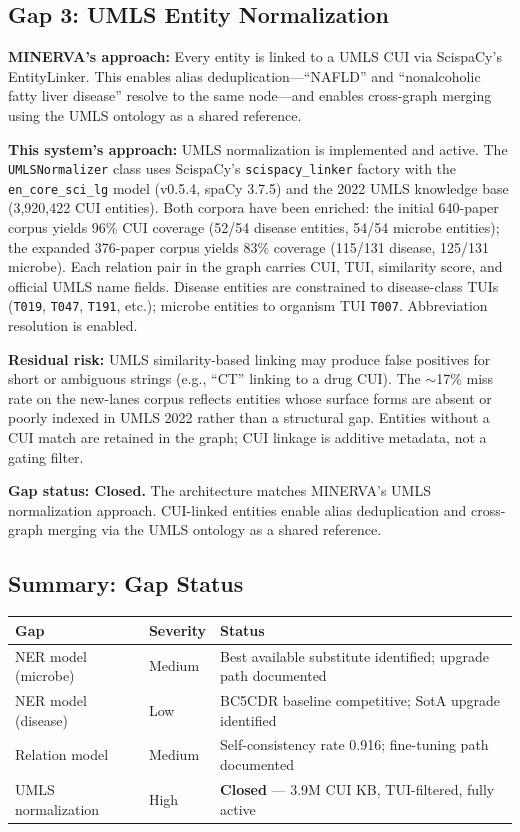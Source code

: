 \documentclass[12pt, letterpaper]{article}
\begin{document}
\subsection{Gap 3: UMLS Entity Normalization}

\textbf{MINERVA's approach:} Every entity is linked to a UMLS CUI via ScispaCy's EntityLinker. This enables alias deduplication—``NAFLD'' and ``nonalcoholic fatty liver disease'' resolve to the same node—and enables cross-graph merging using the UMLS ontology as a shared reference.

\textbf{This system's approach:} UMLS normalization is implemented and active. The \texttt{UMLSNormalizer} class uses ScispaCy's \texttt{scispacy\_linker} factory with the \texttt{en\_core\_sci\_lg} model (v0.5.4, spaCy 3.7.5) and the 2022 UMLS knowledge base (3,920,422 CUI entities). Both corpora have been enriched: the initial 640-paper corpus yields 96\% CUI coverage (52/54 disease entities, 54/54 microbe entities); the expanded 376-paper corpus yields 83\% coverage (115/131 disease, 125/131 microbe). Each relation pair in the graph carries CUI, TUI, similarity score, and official UMLS name fields. Disease entities are constrained to disease-class TUIs (\texttt{T019}, \texttt{T047}, \texttt{T191}, etc.); microbe entities to organism TUI \texttt{T007}. Abbreviation resolution is enabled.

\textbf{Residual risk:} UMLS similarity-based linking may produce false positives for short or ambiguous strings (e.g., ``CT'' linking to a drug CUI). The $\sim$17\% miss rate on the new-lanes corpus reflects entities whose surface forms are absent or poorly indexed in UMLS 2022 rather than a structural gap. Entities without a CUI match are retained in the graph; CUI linkage is additive metadata, not a gating filter.

\textbf{Gap status: Closed.} The architecture matches MINERVA's UMLS normalization approach. CUI-linked entities enable alias deduplication and cross-graph merging via the UMLS ontology as a shared reference.

\subsection{Summary: Gap Status}

\begin{center}
\begin{tabular}{lll}
\textbf{Gap} & \textbf{Severity} & \textbf{Status} \\
\hline
NER model (microbe) & Medium & Best available substitute identified; upgrade path documented \\
NER model (disease) & Low & BC5CDR baseline competitive; SotA upgrade identified \\
Relation model & Medium & Self-consistency rate 0.916; fine-tuning path documented \\
UMLS normalization & High & \textbf{Closed} — 3.9M CUI KB, TUI-filtered, fully active \\
\end{tabular}
\end{center}
\end{document}
